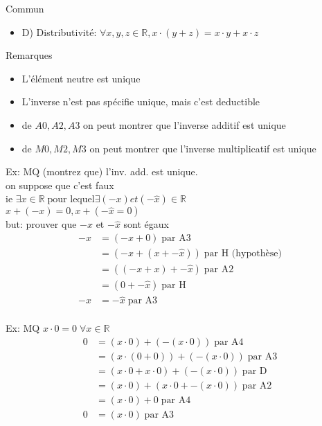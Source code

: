 \documentclass{article}
\begin{document}
Commun
\begin{itemize}
    \item D) Distributivité: $\forall x, y, z \in \mathbb{R}, x \cdot (y + z) = x \cdot y + x \cdot z$
\end{itemize}

Remarques
\begin{itemize}
    \item L’élément neutre est unique
    \item L'inverse n'est pas spécifie unique, mais c'est deductible
    \item de $A0, A2, A3$ on peut montrer que l'inverse additif est unique
    \item de $M0, M2, M3$ on peut montrer que l'inverse multiplicatif est unique

\end{itemize}

Ex: MQ (montrez que) l'inv. add.  est unique.\\
on suppose que c'est faux\\
ie $\exists x \in \mathbb{R} \; \textrm{pour lequel} \exists (-x) et (-\hat{x}) \in \mathbb{R}$ \\
$x + (-x) = 0,  x + (-\hat{x} = 0)$ \\
but: prouver que $-x$ et $-\hat{x}$ sont égaux \\

\begin{equation}
\begin{aligned}
    -x &= (-x + 0) \; \textrm{par A3} \\
       &= (-x + (x + - \hat{x})) \; \textrm{par H (hypothèse)} \\
       &= ((-x + x) + - \hat{x}) \; \textrm{par A2} \\
       &= (0 + - \hat{x}) \; \textrm{par H} \\
    -x &= - \hat{x} \; \textrm{par A3} \\
\end{aligned}
\end{equation}

Ex: MQ $x \cdot 0  = 0 \; \forall x \in \mathbb{R}$ \\

\begin{equation}
\begin{aligned}
    0 &=  (x \cdot 0) + (- (x \cdot 0)) \; \textrm{par A4} \\
      &=  (x \cdot (0 + 0)) + (- (x \cdot 0)) \; \textrm{par A3} \\
      &=  (x \cdot 0 + x \cdot 0) + (- (x \cdot 0)) \; \textrm{par D} \\
      &=  (x \cdot 0) + (x \cdot 0 + - (x \cdot 0)) \; \textrm{par A2} \\
      &=  (x \cdot 0) + 0 \; \textrm{par A4} \\
    0 &=  (x \cdot 0) \; \textrm{par A3} \\
\end{aligned}
\end{equation}
\end{document}
